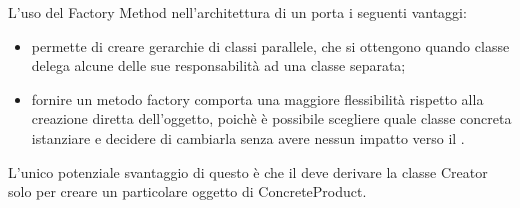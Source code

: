 		L'uso del  Factory Method nell'architettura di un   porta i seguenti vantaggi:
		\begin{itemize}
			\item permette di creare gerarchie di classi parallele, che si ottengono quando classe delega alcune delle sue responsabilità ad una classe separata;
			\item fornire un metodo factory comporta una maggiore flessibilità rispetto alla creazione diretta dell'oggetto, poichè è possibile scegliere quale classe concreta istanziare e decidere di cambiarla senza avere nessun impatto verso il .
		\end{itemize}
		L'unico potenziale svantaggio di questo  è che il  deve derivare la classe Creator solo per creare un particolare oggetto di ConcreteProduct.